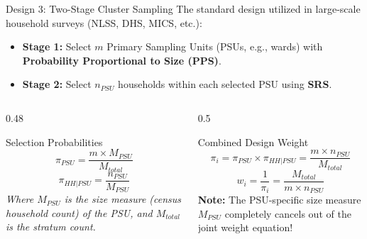 \documentclass[10pt, aspectratio=169]{beamer}
\begin{document}
\begin{frame}{Design 3: Two-Stage Cluster Sampling}
  The standard design utilized in large-scale household surveys (NLSS, DHS, MICS, etc.):
  \begin{itemize}
    \item \textbf{Stage 1:} Select $m$ Primary Sampling Units (PSUs, e.g., wards) with \textbf{Probability Proportional to Size (PPS)}.
    \item \textbf{Stage 2:} Select $n_{PSU}$ households within each selected PSU using \textbf{SRS}.
  \end{itemize}

  \begin{columns}[T]
    \begin{column}{0.48\textwidth}
      \begin{block}{Selection Probabilities}
        $$\pi_{PSU} = \frac{m \times M_{PSU}}{M_{total}}$$
        $$\pi_{HH|PSU} = \frac{n_{PSU}}{M_{PSU}}$$
        \textit{Where $M_{PSU}$ is the size measure (census household count) of the PSU, and $M_{total}$ is the stratum count.}
      \end{block}
    \end{column}
    \begin{column}{0.5\textwidth}
      \begin{block}{Combined Design Weight}
        $$\pi_i = \pi_{PSU} \times \pi_{HH|PSU} = \frac{m \times n_{PSU}}{M_{total}}$$
        \begin{equation}
          w_i = \frac{1}{\pi_i} = \frac{M_{total}}{m \times n_{PSU}}
        \end{equation}
        \textbf{Note:} The PSU-specific size measure $M_{PSU}$ completely cancels out of the joint weight equation!
      \end{block}
    \end{column}
  \end{columns}
\end{frame}
\end{document}
